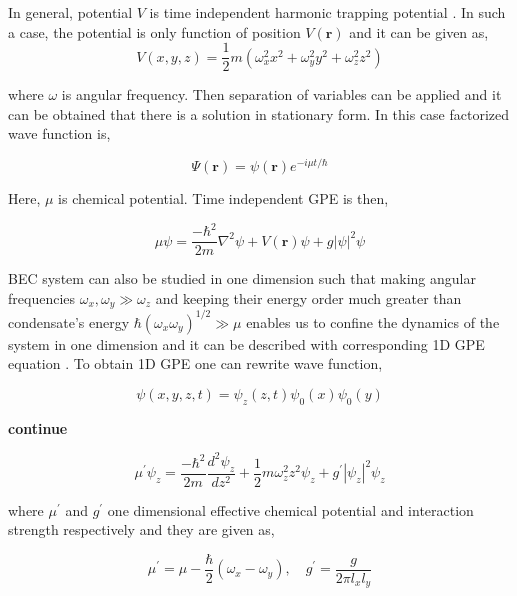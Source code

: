 \documentclass[a4paper,times,12pt]{article}
\begin{document}
In general, potential $V$ is time independent harmonic trapping potential \cite{barenghi2016primer}. In such a case, the potential is only function of position $V(\boldsymbol{r})$ and it can be given as,
\begin{equation}
\label{eq:GPE_harmonic_potential}
V(x, y, z) = \frac{1}{2}m(\omega_x^2 x^2 + \omega_y^2y^2 + \omega_z^2z^2)
\end{equation}


where $\omega$ is angular frequency. Then separation of variables can be applied and it can be obtained that there is a solution in stationary form. In this case factorized wave function is,

\begin{equation}
\label{eq:GPE_time_indep_wave_func}
\Psi(\boldsymbol{r}) = \psi(\boldsymbol{r})e^{-i\mu t/\hbar}
\end{equation}

Here, $\mu$ is chemical potential. Time independent GPE is then,

\begin{equation}
\label{eq:GPE_time_indep}
\mu\psi = \frac{-\hbar^2}{2m}\nabla^2\psi + V(\boldsymbol{r})\psi + g|\psi|^2\psi 
\end{equation}

BEC system can also be studied in one dimension such that making angular frequencies $\omega_x, \omega_y \gg \omega_z$ and keeping their energy order much greater than condensate's energy $ \hbar(\omega_x \omega_y)^{1/2} \gg \mu $ enables us to confine the dynamics of the system in one dimension and it can be described with corresponding 1D GPE equation \cite{barenghi2016primer}. To obtain 1D GPE one can rewrite wave function,

\begin{equation}
\label{eq:GPE_time_indep_wave_func_seperated}
\psi(x, y, z, t) = \psi_z(z, t)\psi_0(x)\psi_0(y)
\end{equation}

\textbf{continue}

\begin{equation}
\label{eq:GPE_1D}
\mu^{\prime}\psi_z = \frac{-\hbar^2}{2m}\frac{d^2\psi_z}{dz^2} + \frac{1}{2}m\omega_z^2 z^2\psi_z + g^{\prime}|\psi_z|^2\psi_z 
\end{equation}

where $\mu^{\prime}$ and $g^{\prime}$ one dimensional effective chemical potential and interaction strength respectively and they are given as,

\begin{equation}
\label{eq:GPE_1D_chem_inter}
\mu^{\prime} = \mu - \frac{\hbar}{2}(\omega_x - \omega_y), \quad g^{\prime} = \frac{g}{2\pi l_x l_y}
\end{equation}
\end{document}
